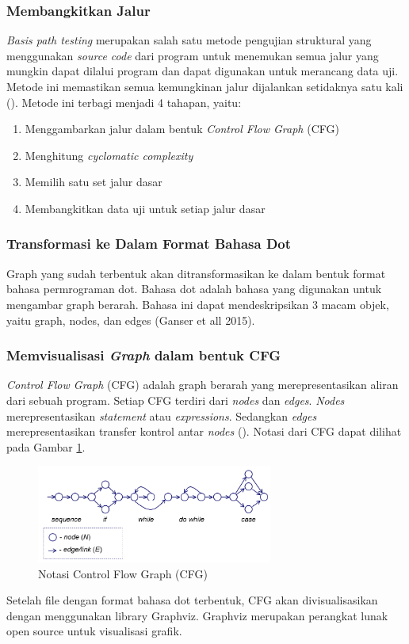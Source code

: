 \subsubsection*{Membangkitkan Jalur}
\textit{Basis path testing} merupakan salah satu metode pengujian struktural yang menggunakan \textit{source code} dari program untuk menemukan semua jalur yang mungkin dapat dilalui program dan dapat digunakan untuk merancang data uji. Metode ini memastikan semua kemungkinan jalur dijalankan setidaknya satu kali (\cite{BASU2015}). Metode ini terbagi menjadi 4 tahapan, yaitu:
\begin{enumerate}[noitemsep] 
	\item Menggambarkan jalur dalam bentuk \textit{ Control Flow Graph} (CFG)
	\item Menghitung \textit{cyclomatic complexity}
	\item Memilih satu set jalur dasar
	\item Membangkitkan data uji untuk setiap jalur dasar
\end{enumerate}


\subsubsection*{Transformasi ke Dalam Format Bahasa Dot}
Graph yang sudah terbentuk akan ditransformasikan ke dalam bentuk format bahasa permrograman dot. Bahasa dot adalah bahasa yang digunakan untuk mengambar graph berarah. Bahasa ini dapat mendeskripsikan 3 macam objek, yaitu graph, nodes, dan edges (Ganser et all 2015).

\subsubsection*{Memvisualisasi \textit{Graph} dalam bentuk CFG}
\textit{Control Flow Graph }(CFG) adalah graph berarah yang merepresentasikan aliran dari sebuah program. Setiap CFG terdiri dari \textit{nodes} dan \textit{edges}. \textit{Nodes} merepresentasikan \textit{statement} atau \textit{expressions}. Sedangkan \textit{edges} merepresentasikan transfer kontrol antar \textit{nodes} (\cite{MCCABE}). Notasi dari CFG dapat dilihat pada Gambar \ref{fig:cfg}.
\begin{figure}[h]
	\centering
	\includegraphics[width=220pt]{gambar/CFG2}
	\caption{Notasi Control Flow Graph (CFG)}
	\label{fig:cfg}
\end{figure}
Setelah file dengan format bahasa dot terbentuk, CFG akan divisualisasikan dengan menggunakan library Graphviz. Graphviz merupakan perangkat lunak open source untuk visualisasi grafik. 


